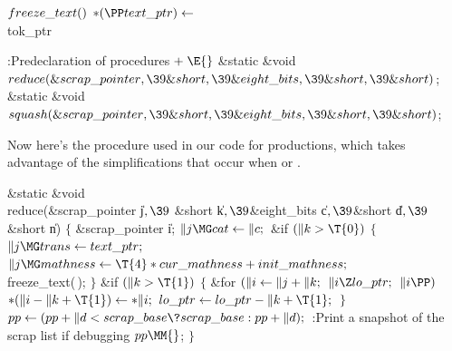 \Y\B\4\D$\\{freeze\_text}()$ \5
${*}(\PP\\{text\_ptr})\K{}$\\{tok\_ptr}\par
\Y\B\4:Predeclaration of procedures\X${}\mathrel+\E{}$\6
\&{static} \&{void} ${}\\{reduce}(\&{scrap\_pointer},\39\&{short},\39\&{eight%
\_bits},\39\&{short},\39\&{short}){}$;\6
\&{static} \&{void} ${}\\{squash}(\&{scrap\_pointer},\39\&{short},\39\&{eight%
\_bits},\39\&{short},\39\&{short}){}$;\par
\fi

Now here's the  procedure used in our code for
productions,
which takes advantage of the simplifications that occur when 
or .

\Y\B\1\1\&{static} \&{void} \\{reduce}(\&{scrap\_pointer} \|j${},\39{}$%
\&{short} \|k${},\39{}$\&{eight\_bits} \|c${},\39{}$\&{short} \|d${},\39{}$%
\&{short} \|n)\2\2\6
${}\{{}$\1\6
\&{scrap\_pointer} \|i;\7
${}\|j\MG\\{cat}\K\|c;{}$\6
\&{if} ${}(\|k>\T{0}){}$\5
${}\{{}$\1\6
${}\|j\MG\\{trans}\K\\{text\_ptr};{}$\6
${}\|j\MG\\{mathness}\K\T{4}*\\{cur\_mathness}+\\{init\_mathness};{}$\6
\\{freeze\_text}(\,);\6
\4${}\}{}$\2\6
\&{if} ${}(\|k>\T{1}){}$\5
${}\{{}$\1\6
\&{for} ${}(\|i\leftarrow\|j+\|k;{}$ ${}\|i\Z\\{lo\_ptr};{}$ ${}\|i\PP){}$\1\5
${}{*}(\|i-\|k+\T{1})\K{*}\|i;{}$\2\6
${}\\{lo\_ptr}\K\\{lo\_ptr}-\|k+\T{1};{}$\6
\4${}\}{}$\2\6
${}\\{pp}\K(\\{pp}+\|d<\\{scrap\_base}\?\\{scrap\_base}:\\{pp}+\|d);{}$\6
:Print a snapshot of the scrap list if debugging\X\6
${}\\{pp}\MM{}$;\6
\4${}\}{}$\2\par
\fi

